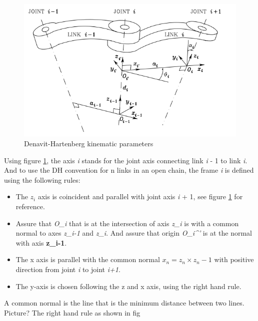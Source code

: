 \begin{figure}[H]
    \centering
    \includegraphics{Images/Task1.1&1.2/DH-original.png}
    \caption{Denavit-Hartenberg kinematic parameters}
    \label{fig:DH-OG}
\end{figure}

Using figure \ref{fig:DH-OG}, the axis \textit{i} stands for the joint axis connecting link \textit{i} - 1 to link \textit{i}. And to use the DH convention for n links in an open chain, the frame \textit{i} is defined using the following rules: 

\begin{itemize}
    \item The \(z_\textit{i}\) axis is coincident and parallel with joint axis \textit{i} + 1, see figure \ref{fig:DH-OG} for reference.
    \item Assure that \textit{O_i} that is at the intersection of axis \textit{z_i} is with a common normal to axes \textit{z_i-1} and \textit{z_i}. And assure that origin \textit{O_i^'} is at the normal with axis \textbf{z_i-1}.
    \item The x axis is parallel with the common normal \(x_n = z_n \times  z_n-1\) with positive direction from joint \textit{i} to joint \textit{i+1}.
    \item The y-axis is chosen following the z and x axis, using the right hand rule.
\end{itemize}

 A common normal is the line that is the minimum distance between two lines. Picture?
The right hand rule as shown in fig

